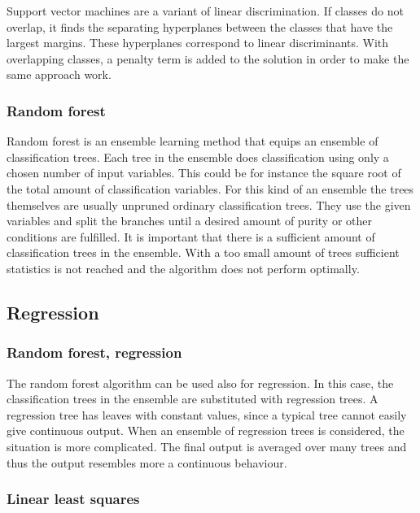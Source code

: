 \documentclass[twoside]{article}
\begin{document}
\begin{multicols}{2}
Support vector machines are a variant of linear discrimination. If classes do not overlap, it finds
the separating hyperplanes between the classes that have the largest margins. These hyperplanes correspond 
to linear discriminants. With overlapping classes, a penalty term is added to the solution in order
to make the same approach work.

\subsubsection{Random forest}\label{method:randfor}

Random forest \cite{Forest} is an ensemble learning method that equips an ensemble of classification trees. Each tree 
in the ensemble does classification using only a chosen number of input variables. This could be for
instance the square root of the total amount of classification variables. For this kind of an ensemble
the trees themselves are usually unpruned ordinary classification trees.
They use the given variables and split the branches until a desired amount of purity or other conditions
are fulfilled. It is important that there is a sufficient amount of classification
trees in the ensemble. With a too small amount of trees sufficient statistics is not reached and the algorithm
does not perform optimally.

\subsection{Regression}

\subsubsection{Random forest, regression}

The random forest algorithm can be used also for regression. In this case, the classification trees in the 
ensemble are substituted with regression trees. A regression tree has leaves with constant values,
since a typical tree cannot easily give continuous output. When an ensemble of regression trees is considered, the 
situation is more complicated. The final output is averaged over many trees and thus the output resembles
more a continuous behaviour.

\subsubsection{Linear least squares}\label{method:leastsquare}


\end{multicols}
\end{document}
